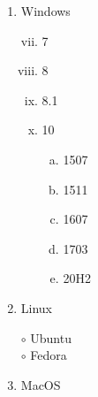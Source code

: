 \documentclass[a4paper,11pt]{article}
\begin{document}
\begin{enumerate}[A]
\item Windows
\begin{enumerate}[i.]
\setcounter{enumii}{6}
\item 7
\item 8
\item 8.1
\item 10
\begin{enumerate}[a.)]
\item 1507
\item 1511
\item 1607
\item 1703
\setcounter{enumiii}{10}
\item 20H2
\end{enumerate}

\end{enumerate}



\item Linux

$\circ$ Ubuntu
\\
$\circ$ Fedora

\item MacOS

\end{enumerate}
\end{document}
